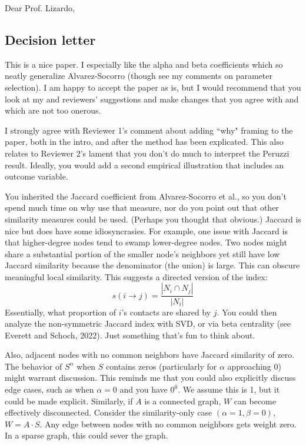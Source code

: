 \documentclass[11pt]{article}
\begin{document}
\noindent Dear Prof. Lizardo,

\subsection*{Decision letter}

This is a nice paper. I especially like the alpha and beta coefficients which so neatly generalize Alvarez-Socorro (though see my comments on parameter selection). I am happy to accept the paper as is, but I would recommend that you look at my and reviewers' suggestions and make changes that you agree with and which are not too onerous.

I strongly agree with Reviewer 1's comment about adding ``why" framing to the paper, both in the intro, and after the method has been explicated. This also relates to Reviewer 2's lament that you don't do much to interpret the Peruzzi result. Ideally, you would add a second empirical illustration that includes an outcome variable.

You inherited the Jaccard coefficient from Alvarez-Socorro et al., so you don't spend much time on why use that measure, nor do you point out that other similarity measures could be used. (Perhaps you thought that obvious.) Jaccard is nice but does have some idiosyncrasies. For example, one issue with Jaccard is that higher-degree nodes tend to swamp lower-degree nodes. Two nodes might share a substantial portion of the smaller node's neighbors yet still have low Jaccard similarity because the denominator (the union) is large. This can obscure meaningful local similarity. This suggests a directed version of the index:
\[ s(i \rightarrow j) = \frac{|N_i \cap N_j|}{|N_i|} \]
Essentially, what proportion of $i$'s contacts are shared by $j$. You could then analyze the non-symmetric Jaccard index with SVD, or via beta centrality (see Everett and Schoch, 2022). Just something that's fun to think about.

Also, adjacent nodes with no common neighbors have Jaccard similarity of zero. The behavior of $S^\alpha$ when $S$ contains zeros (particularly for $\alpha$ approaching 0) might warrant discussion. This reminds me that you could also explicitly discuss edge cases, such as when $\alpha = 0$ and you have $0^0$. We assume this is 1, but it could be made explicit. Similarly, if $A$ is a connected graph, $W$ can become effectively disconnected. Consider the similarity-only case $(\alpha=1, \beta=0)$, $W = A \cdot S$. Any edge between nodes with no common neighbors gets weight zero. In a sparse graph, this could sever the graph.
\end{document}
